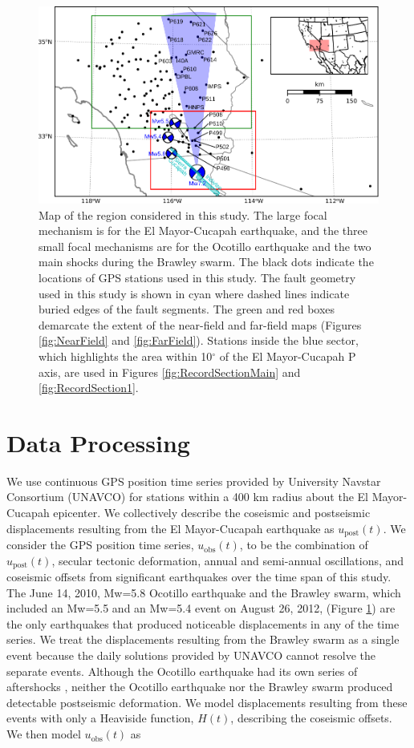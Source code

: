 \documentclass[draft,linenumbers]{AGUJournal}
\begin{document}
\begin{figure}
\includegraphics[scale=0.8]{Figures/ContextMap} 
\caption{Map of the region considered in this study.  The large focal mechanism is for the El Mayor-Cucapah earthquake, and the three small focal mechanisms are for the Ocotillo earthquake and the two main shocks during the Brawley swarm.  The black dots indicate the locations of GPS stations used in this study.  The fault geometry used in this study is shown in cyan where dashed lines indicate buried edges of the fault segments.  The green and red boxes demarcate the extent of the near-field and far-field maps (Figures \ref{fig:NearField} and \ref{fig:FarField}).  Stations inside the blue sector, which highlights the area within 10$^\circ$ of the El Mayor-Cucapah P axis, are used in Figures \ref{fig:RecordSectionMain} and \ref{fig:RecordSection1}.}       
\label{fig:ContextMap}
\end{figure}

\section{Data Processing}\label{sec:Data}
We use continuous GPS position time series provided by University Navstar Consortium (UNAVCO) for stations within a 400 km radius about the El Mayor-Cucapah epicenter. We collectively describe the coseismic and postseismic displacements resulting from the El Mayor-Cucapah earthquake as $u_\mathrm{post}(t)$.  We consider the GPS position time series, $u_\mathrm{obs}(t)$, to be the combination of $u_\mathrm{post}(t)$, secular tectonic deformation, annual and semi-annual oscillations, and coseismic offsets from significant earthquakes over the time span of this study.  The June 14, 2010, Mw=5.8 Ocotillo earthquake and the Brawley swarm, which included an Mw=5.5 and an Mw=5.4 event on August 26, 2012, (Figure \ref{fig:ContextMap}) are the only earthquakes that produced noticeable displacements in any of the time series.  We treat the displacements resulting from the Brawley swarm as a single event because the daily solutions provided by UNAVCO cannot resolve the separate events.  Although the Ocotillo earthquake had its own series of aftershocks \citep{Hauksson2011}, neither the Ocotillo earthquake nor the Brawley swarm produced detectable postseismic deformation.  We model displacements resulting from these events with only a Heaviside function, $H(t)$, describing the coseismic offsets.  We then model $u_\mathrm{obs}(t)$ as 
\end{document}
